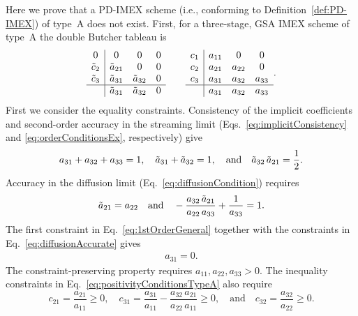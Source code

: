 Here we prove that a PD-IMEX scheme (i.e., conforming to Definition~\ref{def:PD-IMEX}) of type~A does not exist.  
First, for a three-stage, GSA IMEX scheme of type~A the double Butcher tableau is
\begin{equation*}
  \begin{array}{c | c c c}
  	      0       & 0              & 0              & 0 \\
  	\tilde{c}_{2} & \tilde{a}_{21} & 0              & 0 \\
  	\tilde{c}_{3} & \tilde{a}_{31} & \tilde{a}_{32} & 0 \\ \hline
  	              & \tilde{a}_{31} & \tilde{a}_{32} & 0
  \end{array}
  \qquad
  \begin{array}{c | c c c}
    c_{1} & a_{11} & 0      & 0      \\
  	c_{2} & a_{21} & a_{22} & 0      \\
  	c_{3} & a_{31} & a_{32} & a_{33} \\ \hline
  	      & a_{31} & a_{32} & a_{33}
  \end{array}.
\end{equation*}
First we consider the equality constraints.  
Consistency of the implicit coefficients and second-order accuracy in the streaming limit (Eqs.~\eqref{eq:implicitConsistency} and \eqref{eq:orderConditionsEx}, respectively) give
\begin{align}
  a_{31} + a_{32} + a_{33} = 1, \quad \tilde{a}_{31} + \tilde{a}_{32} = 1, \quad \text{and}\quad \tilde{a}_{32}\,\tilde{a}_{21} =  \frac{1}{2}.
  \label{eq:1stOrderGeneral}
\end{align}
Accuracy in the diffusion limit (Eq.~\eqref{eq:diffusionCondition}) requires 
\begin{align}
  \tilde{a}_{21} = a_{22}
  \quad\text{and}\quad 
  -\frac{a_{32}\,\tilde{a}_{21}}{a_{22}\,a_{33}} + \frac{1}{a_{33}} = 1.
\label{eq:diffusionAccurate}
\end{align}
The first constraint in Eq.~\eqref{eq:1stOrderGeneral} together with the constraints in Eq.~\eqref{eq:diffusionAccurate} gives
\begin{align}
  a_{31} = 0.
  \label{eq:a31is0}
\end{align}
The constraint-preserving property requires $a_{11}, a_{22}, a_{33}>0$.  
The inequality constraints in Eq.~\eqref{eq:positivityConditionsTypeA} also require
\begin{equation}
  c_{21} = \frac{a_{21}}{a_{11}} \geq 0, \quad
  c_{31} = \frac{a_{31}}{a_{11}} - \frac{a_{32}\,a_{21}}{a_{22}\,a_{11}} \geq 0, \quad\text{and}\quad
  c_{32} = \frac{a_{32}}{a_{22}} \geq 0.
  \label{eq:constraintsTypeA}
\end{equation}
